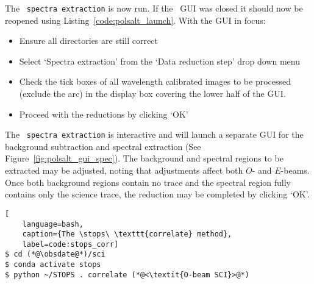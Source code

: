 The \polsalt\ \texttt{spectra extraction} is now run. If the \polsalt\ \gls{GUI} was closed it should now be reopened using Listing~\ref{code:polsalt_launch}. With the \gls{GUI} in focus:
\begin{itemize}
    \item Ensure all directories are still correct
    \item Select `Spectra extraction' from the `Data reduction step' drop down menu
    \item Check the tick boxes of all wavelength calibrated images to be processed (exclude the arc) in the display box covering the lower half of the \gls{GUI}.
    \item Proceed with the reductions by clicking `OK'
\end{itemize}

The \polsalt\ \texttt{spectra extraction} is interactive and will launch a separate \gls{GUI} for the background subtraction and spectral extraction (See Figure~\ref{fig:polsalt_gui_spec}). The background and spectral regions to be extracted may be adjusted, noting that adjustments affect both $O$- and $E$-beams. Once both background regions contain no trace and the spectral region fully contains only the science trace, the reduction may be completed by clicking `OK'.

\begin{lstlisting}[
    language=bash,
    caption={The \stops\ \texttt{correlate} method},
    label=code:stops_corr]
$ cd (*@\obsdate@*)/sci
$ conda activate stops
$ python ~/STOPS . correlate (*@<\textit{O-beam SCI}>@*)
\end{lstlisting}


